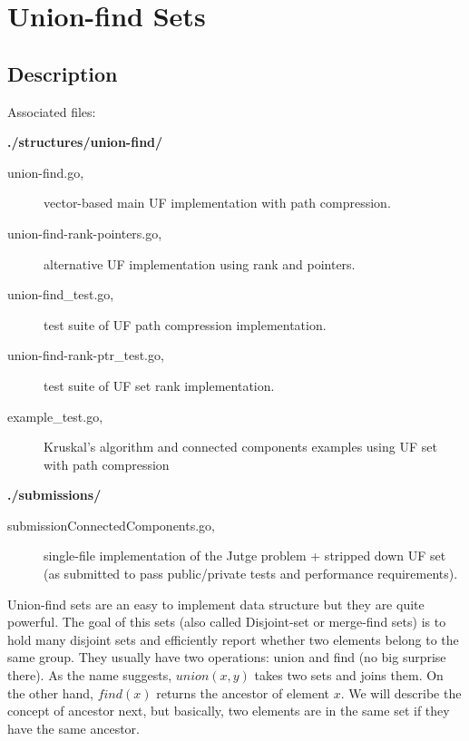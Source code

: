 \documentclass[a4paper,10pt,table,xcdraw]{article}
\begin{document}
\section{Union-find Sets}
\label{sec:union-find}

\subsection{Description}

Associated files:

\textbf{./structures/union-find/}
\begin{description}
\item [\hspace{10mm} union-find.go,] vector-based main UF implementation with path compression.
\item [\hspace{10mm} union-find-rank-pointers.go,] alternative UF implementation using rank and pointers.
\item [\hspace{10mm} union-find\_test.go,] test suite of UF path compression implementation.
\item [\hspace{10mm} union-find-rank-ptr\_test.go,] test suite of UF set rank implementation.
\item [\hspace{10mm} example\_test.go,] Kruskal's algorithm and connected components examples using UF set with path compression
\end{description}
\textbf{./submissions/}
\begin{description}
\item [\hspace{10mm} submissionConnectedComponents.go,] single-file implementation of the Jutge problem + stripped down UF set (as submitted to pass public/private tests and performance requirements). 
\end{description}

Union-find sets are an easy to implement data structure but they are quite powerful. The goal of this sets (also called Disjoint-set or merge-find sets) is to hold many disjoint sets and efficiently report whether two elements belong to the same group. They usually have two operations: union and find (no big surprise there). As the name suggests, $union(x, y)$ takes two sets and joins them. On the other hand, $find(x)$ returns the ancestor of element $x$. We will describe the concept of ancestor next, but basically, two elements are in the same set if they have the same ancestor.
\end{document}
